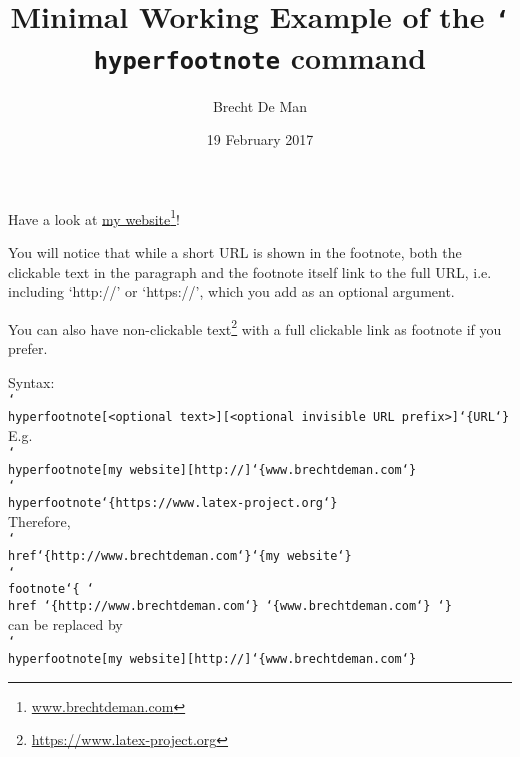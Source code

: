 \documentclass{article}
\title{Minimal Working Example of the \texttt{\char`\\ hyperfootnote} command}
\author{Brecht De Man}
\date{19 February 2017}
\newcommand{\hyperfootnote}[1][]{\def\ArgI{{#1}}\hyperfootnoteRelay}
\newcommand\hyperfootnoteRelay[2][]{\href{#1#2}{\ArgI}\footnote{\href{#1#2}{#2}}}
\begin{document}
\maketitle %


	Have a look at \hyperfootnote[my website][http://]{www.brechtdeman.com}! 

	You will notice that while a short URL is shown in the footnote, both the clickable text in the paragraph and the footnote itself link to the full URL, i.e. including `http://' or `https://', which you add as an optional argument. 

	You can also have non-clickable text\hyperfootnote{https://www.latex-project.org} with a full clickable link as footnote if you prefer. 

	\vspace{2em}
	Syntax:\\
	\texttt{\char`\\ hyperfootnote[<optional text>][<optional invisible URL prefix>]\char`\{URL\char`\}}\\
	E.g. \\
	\texttt{\char`\\ hyperfootnote[my website][http://]\char`\{www.brechtdeman.com\char`\}}\\
	\texttt{\char`\\ hyperfootnote\char`\{https://www.latex-project.org\char`\}}\\

	\vspace{2em}
	Therefore, \\
	\texttt{\char`\\ href\char`\{http://www.brechtdeman.com\char`\}\char`\{my website\char`\}\\
		\char`\\ footnote\char`\{ \char`\\ href \char`\{http://www.brechtdeman.com\char`\} \char`\{www.brechtdeman.com\char`\} \char`\} } \\
	can be replaced by \\
	\texttt{\char`\\ hyperfootnote[my website][http://]\char`\{www.brechtdeman.com\char`\}}\\
\end{document}
